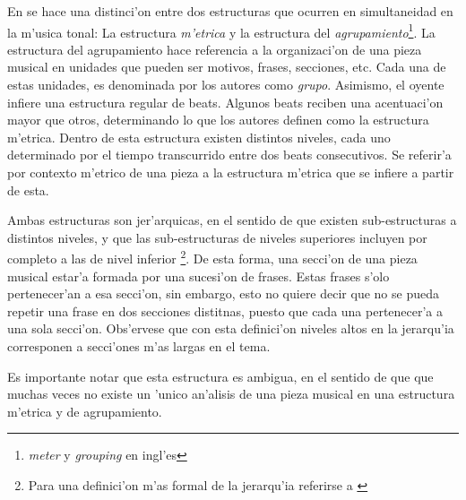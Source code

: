 En \citet*{LerdahlJackendoff83} se hace una distinci'on entre dos estructuras que ocurren en simultaneidad en la m'usica tonal:
La estructura \emph{m'etrica} y la estructura del \emph{agrupamiento}\footnote{\emph{meter} y \emph{grouping} en ingl'es}. 
La estructura del agrupamiento hace referencia a la organizaci'on de una pieza musical en unidades que pueden ser motivos, frases, secciones, etc. 
Cada una de estas unidades, es denominada por los autores como \emph{grupo}. Asimismo, el oyente infiere una estructura regular de beats. 
Algunos beats reciben una acentuaci'on mayor que otros, determinando lo que los autores definen como la estructura m'etrica. Dentro de esta estructura
existen distintos niveles, cada uno determinado por el tiempo transcurrido entre dos beats consecutivos. 
Se referir'a por contexto m'etrico de una pieza a la estructura m'etrica que se infiere a partir de esta.

Ambas estructuras son jer'arquicas, en el sentido de que existen sub-estructuras a distintos niveles, y que las sub-estructuras de niveles superiores 
incluyen por completo a las de nivel inferior
\footnote{Para una definici'on m'as formal de la jerarqu'ia referirse a \citet[cap. ~2]{LerdahlJackendoff83}}. De esta forma, una secci'on
de una pieza musical estar'a formada por una sucesi'on de frases. Estas frases s'olo pertenecer'an a esa secci'on, sin embargo, esto no quiere decir
que no se pueda repetir una frase en dos secciones distitnas, puesto que cada una pertenecer'a a una sola secci'on. Obs'ervese que con esta definici'on
niveles altos en la jerarqu'ia corresponen a secci'ones m'as largas en el tema.

%
%
%
Es importante notar que esta estructura es ambigua, en el sentido de que que muchas veces no existe un 'unico an'alisis de una pieza musical 
en una estructura m'etrica y de agrupamiento.


